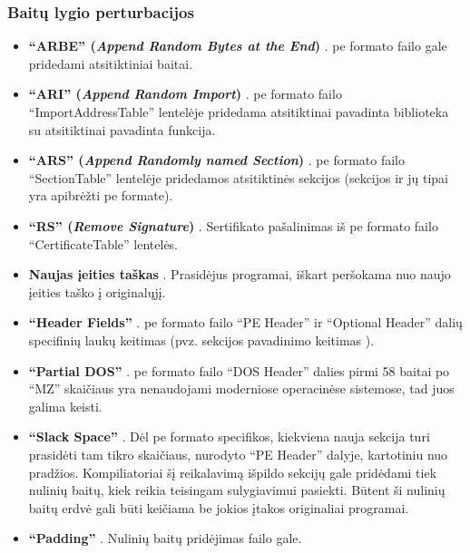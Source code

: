 \subsubsection{Baitų lygio perturbacijos}
\begin{itemize}
    \item \textbf{\enquote{ARBE} (\textit{Append Random Bytes at the End})} \cite{fangEvadingMalwareEngines2019}. \acs{pe} formato failo gale pridedami atsitiktiniai baitai.
    \item \textbf{\enquote{ARI} (\textit{Append Random Import})} \cite{fangEvadingMalwareEngines2019}. \acs{pe} formato failo \enquote{ImportAddressTable} lentelėje pridedama atsitiktinai pavadinta biblioteka su atsitiktinai pavadinta funkcija.
    \item \textbf{\enquote{ARS} (\textit{Append Randomly named Section})} \cite{fangEvadingMalwareEngines2019}. \acs{pe} formato failo \enquote{SectionTable} lentelėje pridedamos atsitiktinės sekcijos (sekcijos ir jų tipai yra apibrėžti \acs{pe} formate).
    \item \textbf{\enquote{RS} (\textit{Remove Signature})} \cite{fangEvadingMalwareEngines2019}. Sertifikato pašalinimas iš \acs{pe} formato failo \enquote{CertificateTable} lentelės.
    \item \textbf{Naujas įeities taškas} \cite{andersonLearningEvadeStatic2018}. Prasidėjus programai, iškart peršokama nuo naujo įeities taško į originalųjį.
    \item \textbf{\enquote{Header Fields}} \cite{demetrioAdversarialEXEmplesSurvey2021}. \acs{pe} formato failo \enquote{PE Header} ir \enquote{Optional Header} dalių specifinių laukų keitimas (pvz. sekcijos pavadinimo keitimas \cite{andersonLearningEvadeStatic2018}).
    \item \textbf{\enquote{Partial DOS}} \cite{demetrioAdversarialEXEmplesSurvey2021}. \acs{pe} formato failo \enquote{DOS Header} dalies pirmi 58 baitai po \enquote{MZ} skaičiaus yra nenaudojami moderniose operacinėse sistemose, tad juos galima keisti.
    \item \textbf{\enquote{Slack Space}} \cite{demetrioAdversarialEXEmplesSurvey2021}. Dėl \acs{pe} formato specifikos, kiekviena nauja sekcija turi prasidėti tam tikro skaičiaus, nurodyto \enquote{PE Header} dalyje, kartotiniu nuo pradžios. Kompiliatoriai šį reikalavimą išpildo sekcijų gale pridėdami tiek nulinių baitų, kiek reikia teisingam sulygiavimui pasiekti. Būtent ši nulinių baitų erdvė gali būti keičiama be jokios įtakos originaliai programai.
    \item \textbf{\enquote{Padding}} \cite{demetrioAdversarialEXEmplesSurvey2021}. Nulinių baitų pridėjimas failo gale.

\end{itemize}
